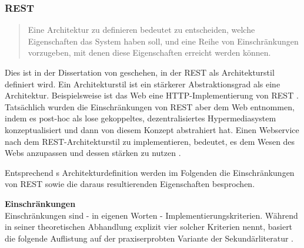 \documentclass[12pt,a4paper,bibliography=totocnumbered,listof=totoc]{scrartcl}
\begin{document}
\subsubsection{REST}
\begin{quote}
\glqq Eine Architektur zu definieren bedeutet zu entscheiden, welche Eigenschaften das System haben soll, und eine Reihe von Einschränkungen vorzugeben, mit denen diese Eigenschaften erreicht werden können.\grqq{} \citep{tilkov11}
\end{quote}

Dies ist in der Dissertation von \citeauthor{fielding00} geschehen, in der REST als Architekturstil definiert wird. Ein Architekturstil ist ein stärkerer Abstraktionsgrad als eine Architektur. Beispielsweise ist das Web eine HTTP-Implementierung von REST \citep{tilkov11}. Tatsächlich wurden die Einschränkungen von REST aber dem Web entnommen, indem \citeauthor{fielding00} es post-hoc als lose gekoppeltes, dezentralisiertes Hypermediasystem konzeptualisiert \citep{wilde11} und dann von diesem Konzept abstrahiert hat. Einen Webservice nach dem REST-Architekturstil zu implementieren, bedeutet, es dem Wesen des Webs anzupassen und dessen stärken zu nutzen \citep{tilkov11}.

Entsprechend \citeauthor{tilkov11}s Architekturdefinition werden im Folgenden die Einschränkungen von REST sowie die daraus resultierenden Eigenschaften besprochen.

\textbf{Einschränkungen}\\
Einschränkungen sind - in eigenen Worten - Implementierungskriterien. Während \citeauthor{fielding00} in seiner theoretischen Abhandlung explizit vier solcher Kriterien nennt, basiert die folgende Auflistung auf der praxiserprobten Variante der Sekundärliteratur \citep{wilde11, tilkov11}.
\end{document}
